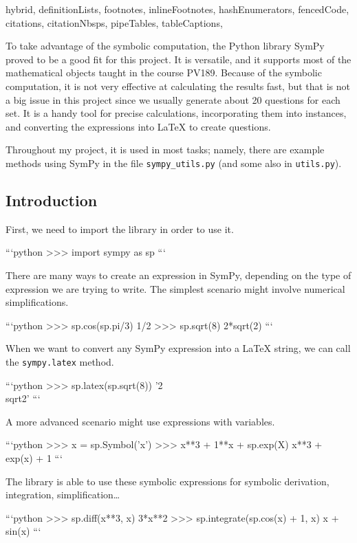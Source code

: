\shorthandoff{-}
\begin{markdown*}{%
  hybrid,
  definitionLists,
  footnotes,
  inlineFootnotes,
  hashEnumerators,
  fencedCode,
  citations,
  citationNbsps,
  pipeTables,
  tableCaptions,
}

To take advantage of the symbolic computation, the Python library SymPy \cite{sympy} proved to be a good fit for this project. It is versatile, and it supports most of the mathematical objects taught in the course PV189. Because of the symbolic computation, it is not very effective at calculating the results fast, but that is not a big issue in this project since we usually generate about 20 questions for each set. It is a handy tool for precise calculations, incorporating them into instances, and converting the expressions into \LaTeX{} to create questions.

Throughout my project, it is used in most tasks; namely, there are example methods using SymPy in the file \verb|sympy_utils.py| (and some also in \verb|utils.py|).  

\subsection{Introduction}

First, we need to import the library in order to use it.

```python
>>> import sympy as sp
```


There are many ways to create an expression in SymPy, depending on the type of expression we are trying to write. The simplest scenario might involve numerical simplifications.

```python
>>> sp.cos(sp.pi/3)
1/2
>>> sp.sqrt(8)
2*sqrt(2)
```

When we want to convert any SymPy expression into a \LaTeX{} string, we can call the \verb|sympy.latex| method.

```python
>>> sp.latex(sp.sqrt(8))
'2 \\sqrt{2}'
```

A more advanced scenario might use expressions with variables.

```python
>>> x = sp.Symbol('x')
>>> x**3 + 1**x + sp.exp(X)
x**3 + exp(x) + 1
```

The library is able to use these symbolic expressions for symbolic derivation, integration, simplification\ldots

```python
>>> sp.diff(x**3, x)
3*x**2
>>> sp.integrate(sp.cos(x) + 1, x)
x + sin(x)
```


\end{markdown*}
